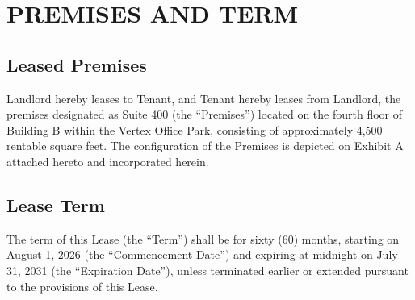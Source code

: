 \section{PREMISES AND TERM}
\subsection{Leased Premises}
Landlord hereby leases to Tenant, and Tenant hereby leases from Landlord, the premises designated as Suite 400 (the ``Premises'') located on the fourth floor of Building B within the Vertex Office Park, consisting of approximately 4,500 rentable square feet. The configuration of the Premises is depicted on Exhibit A attached hereto and incorporated herein.

\subsection{Lease Term}
The term of this Lease (the ``Term'') shall be for sixty (60) months, starting on August 1, 2026 (the ``Commencement Date'') and expiring at midnight on July 31, 2031 (the ``Expiration Date''), unless terminated earlier or extended pursuant to the provisions of this Lease.
